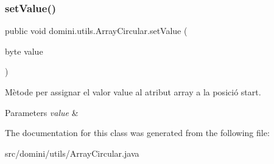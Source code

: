 \subsubsection{\texorpdfstring{set\+Value()}{setValue()}}
{\footnotesize\ttfamily public void domini.\+utils.\+Array\+Circular.\+set\+Value (\begin{DoxyParamCaption}\item[{byte}]{value }\end{DoxyParamCaption})\hspace{0.3cm}{\ttfamily [inline]}}



Mètode per assignar el valor value al atribut array a la posició start. 


\begin{DoxyParams}{Parameters}
{\em value} & \\
\hline
\end{DoxyParams}


The documentation for this class was generated from the following file\+:\begin{DoxyCompactItemize}
\item 
src/domini/utils/Array\+Circular.\+java\end{DoxyCompactItemize}
